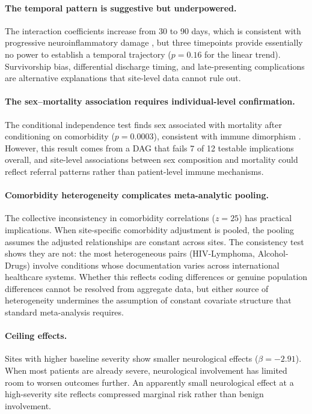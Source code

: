 \documentclass{article}
\begin{document}
\paragraph{The temporal pattern is suggestive but underpowered.}
The interaction coefficients increase from 30 to 90 days, which is consistent with progressive neuroinflammatory damage \cite{douaud2022brain, nalbandian2021pasc}, but three timepoints provide essentially no power to establish a temporal trajectory ($p = 0.16$ for the linear trend).
Survivorship bias, differential discharge timing, and late-presenting complications are alternative explanations that site-level data cannot rule out.

\paragraph{The sex--mortality association requires individual-level confirmation.}
The conditional independence test finds sex associated with mortality after conditioning on comorbidity ($p = 0.0003$), consistent with immune dimorphism \cite{takahashi2020sex}.
However, this result comes from a DAG that fails 7 of 12 testable implications overall, and site-level associations between sex composition and mortality could reflect referral patterns rather than patient-level immune mechanisms.

\paragraph{Comorbidity heterogeneity complicates meta-analytic pooling.}
The collective inconsistency in comorbidity correlations ($z = 25$) has practical implications.
When site-specific comorbidity adjustment is pooled, the pooling assumes the adjusted relationships are constant across sites.
The consistency test shows they are not: the most heterogeneous pairs (HIV-Lymphoma, Alcohol-Drugs) involve conditions whose documentation varies across international healthcare systems.
Whether this reflects coding differences or genuine population differences cannot be resolved from aggregate data, but either source of heterogeneity undermines the assumption of constant covariate structure that standard meta-analysis requires.

\paragraph{Ceiling effects.}
Sites with higher baseline severity show smaller neurological effects ($\beta = -2.91$).
When most patients are already severe, neurological involvement has limited room to worsen outcomes further.
An apparently small neurological effect at a high-severity site reflects compressed marginal risk rather than benign involvement.
\end{document}

